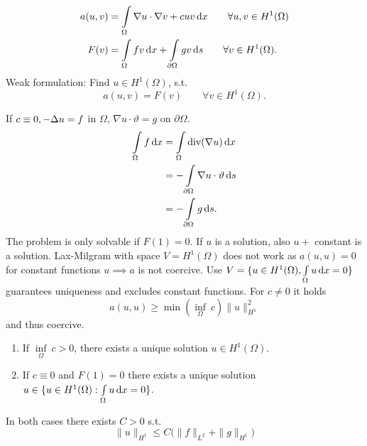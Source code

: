 \begin{enumerate}[=(\alph*)]
\begin{align*}
		a(u,v) &= \int \limits_\Omega \nabla u \cdot  \nabla v + cuv \mathop{}\!\mathrm{d} x \qquad \forall u,v\in H^1(\Omega)\\
		F(v) &= \int \limits_\Omega fv \mathop{}\!\mathrm{d} x + \int \limits_{\partial\Omega} gv \mathop{}\!\mathrm{d} s \qquad \forall v \in H^1(\Omega).
	\end{align*}
	Weak formulation: Find $u \in H^1(\Omega)$, s.t.
	\begin{equation*}
		a(u,v) = F(v) \qquad \forall v \in H^1(\Omega).
	\end{equation*}
	\begin{comment_}
		If $c \equiv 0, -\Delta u=f$ in $\Omega$, $\nabla u\cdot\vartheta = g$ on $\partial \Omega$.
		\begin{align*}
			\int \limits_\Omega f \mathop{}\!\mathrm{d} x &= \int \limits_\Omega \text{div}(\nabla u) \mathop{}\!\mathrm{d} x\\
			&= -\int \limits_{\partial \Omega} \nabla u \cdot  \vartheta \mathop{}\!\mathrm{d} s\\
			&= -\int \limits_{\partial \Omega} g \mathop{}\!\mathrm{d} s.
		\end{align*}
		The problem is only solvable if $F(1)=0$. If $u$ is a solution, also $u +$ constant is a solution.\enter
		Lax-Milgram with space $V = H^1(\Omega)$ does not work as $a(u,u)=0$ for constant functions $u \implies a$ is not coercive.\enter
		Use $V = \{ u \in H^1(\Omega), \int \limits_\Omega u \mathop{}\!\mathrm{d} x =0 \}$ guarantees uniqueness and excludes constant functions. For $c \neq 0$ it holds 
		\begin{equation*}
			a(u,u) \geq \min\left( \underset{\Omega}{\inf}\ c \right)\|u\|^2_{H^1} 
		\end{equation*}
		and thus coercive.
	\end{comment_}
	\begin{thrm}\enter
		\begin{enumerate}[label=(\Roman*)]
			\item If $\underset{\Omega}{\inf}\ c > 0$, there exists a unique solution $u \in H^1(\Omega)$.
			\item If $c \equiv 0$ and $F(1)=0$ there exists a unique solution $u \in \{ u \in H^1(\Omega): \int \limits_\Omega u \mathop{}\!\mathrm{d} x =0 \}$.
		\end{enumerate}
		In both cases there exists $C > 0$ s.t. 
		\begin{equation*}
			\|u\|_{H^1} \leq C \big ( \|f\|_{L^2} + \|g\|_{H^1} \big )	
		\end{equation*}
	\end{thrm}
	\begin{proof_}\enter
		\begin{itemize}

\end{itemize}
\end{proof_}
\end{enumerate}
